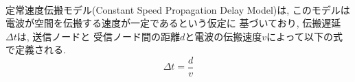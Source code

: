 \\
\indent 定常速度伝搬モデル(Constant Speed Propagation Delay Model)は, 
このモデルは電波が空間を伝搬する速度が一定であるという仮定に
基づいており, 伝搬遅延$\Delta t$は, 送信ノードと
受信ノード間の距離$d$と電波の伝搬速度$v$によって以下の式で定義される.
\[
  \Delta t = \frac{d}{v}
\]